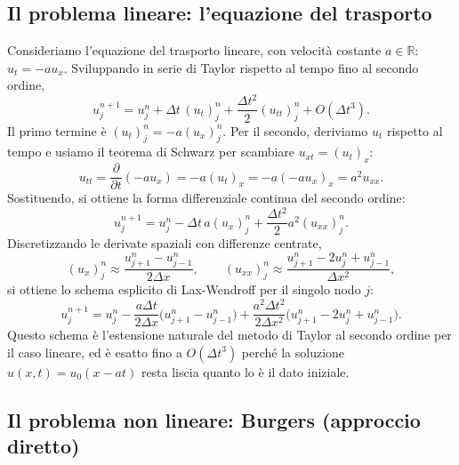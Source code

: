 \documentclass[12pt]{article}
\begin{document}
\subsection{Il problema lineare: l'equazione del trasporto}

Consideriamo l'equazione del trasporto lineare, con velocità costante $a\in\mathbb{R}$: $u_t = -au_x$. Sviluppando in serie di Taylor rispetto al tempo fino al secondo ordine,
\[
u_j^{n+1} = u_j^n + \Delta t\,(u_t)_j^n + \frac{\Delta t^2}{2}(u_{tt})_j^n + O(\Delta t^3).
\]
Il primo termine è $(u_t)_j^n=-a(u_x)_j^n$. Per il secondo, deriviamo $u_t$ rispetto al tempo e usiamo il teorema di Schwarz per scambiare $u_{xt}=(u_t)_x$:
\[
u_{tt} = \frac{\partial}{\partial t}(-au_x) = -a(u_t)_x = -a(-au_x)_x = a^2 u_{xx}.
\]
Sostituendo, si ottiene la forma differenziale continua del secondo ordine:
\[
u_j^{n+1} = u_j^n - \Delta t\,a(u_x)_j^n + \frac{\Delta t^2}{2}a^2(u_{xx})_j^n.
\]
Discretizzando le derivate spaziali con differenze centrate,
\[
(u_x)_j^n \approx \frac{u_{j+1}^n-u_{j-1}^n}{2\Delta x}, \qquad
(u_{xx})_j^n \approx \frac{u_{j+1}^n-2u_j^n+u_{j-1}^n}{\Delta x^2},
\]
si ottiene lo schema esplicito di Lax-Wendroff per il singolo nodo $j$:
\[
u_j^{n+1} = u_j^n - \frac{a\Delta t}{2\Delta x}\bigl(u_{j+1}^n-u_{j-1}^n\bigr) + \frac{a^2\Delta t^2}{2\Delta x^2}\bigl(u_{j+1}^n-2u_j^n+u_{j-1}^n\bigr).
\]
Questo schema è l'estensione naturale del metodo di Taylor al secondo ordine per il caso lineare, ed è esatto fino a $O(\Delta t^3)$ perché la soluzione $u(x,t)=u_0(x-at)$ resta liscia quanto lo è il dato iniziale.

\newpage
\subsection{Il problema non lineare: Burgers (approccio diretto)}
\end{document}
